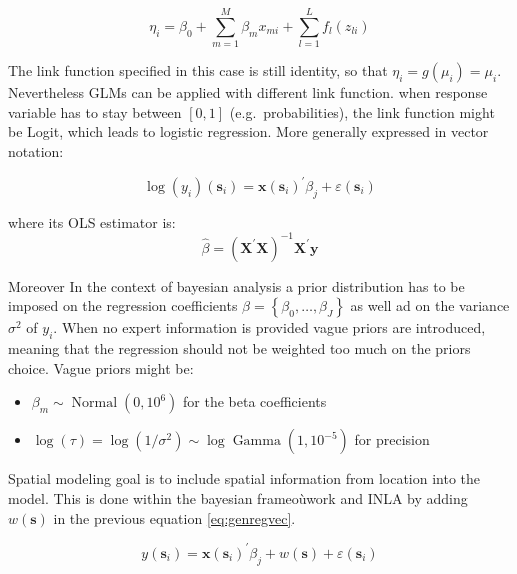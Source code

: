 \documentclass[
  12pt,
  a4paper,
  oneside]{book}
\providecommand{\tightlist}{%
  \setlength{\itemsep}{0pt}\setlength{\parskip}{0pt}}
\theoremstyle{definition}
\theoremstyle{definition}
\theoremstyle{definition}
\theoremstyle{remark}
\begin{document}
\begin{equation}
  \eta_{i}=\beta_{0}+\sum_{m=1}^{M} \beta_{m} x_{m i}+\sum_{l=1}^{L} f_{l}\left(z_{l i}\right)
\label{eq:linearpred}
\end{equation}

The link function specified in this case is still identity, so that \(\eta_{i}=g\left(\mu_{i}\right)=\mu_{i}\). Nevertheless GLMs can be applied with different link function. when response variable has to stay between \([0,1]\) (e.g.~probabilities), the link function might be Logit, which leads to logistic regression. More generally expressed in vector notation:

\begin{equation}
  \log(y_{i})\left(\mathbf{s}_{i}\right)=\mathbf{x}\left(\mathbf{s}_{i}\right)^{\prime} \beta_{j}+\varepsilon\left(\mathbf{s}_{i}\right)
  \label{eq:genregvec}
\end{equation}

where its OLS estimator is:
\begin{equation}
  \hat{\beta}=\left(\mathbf{X}^{\prime} \mathbf{X}\right)^{-1} \mathbf{X}^{\prime} \mathbf{y}
\label{eq:ols}
\end{equation}

Moreover In the context of bayesian analysis a prior distribution has to be imposed on the regression coefficients \(\beta = \left\{\beta_{0}, \ldots, \beta_{J}\right\}\) as well ad on the variance \(\sigma^{2}\) of \(y_{i}\). When no expert information is provided vague priors are introduced, meaning that the regression should not be weighted too much on the priors choice.
Vague priors might be:

\begin{itemize}
\tightlist
\item
  \(\beta_{m} \sim \operatorname{Normal}\left(0,10^{6}\right)\) for the beta coefficients
\item
  \(\log (\tau)=\log \left(1 / \sigma^{2}\right) \sim \log \operatorname{Gamma}\left(1,10^{-5}\right)\) for precision
\end{itemize}

Spatial modeling goal is to include spatial information from location into the model. This is done within the bayesian frameoùwork and INLA by adding \(w(\mathbf{s})\) in the previous equation \eqref{eq:genregvec}.

\[y\left(\mathbf{s}_{i}\right)=\mathbf{x}\left(\mathbf{s}_{i}\right)^{\prime}\beta_{j}+w(\mathbf{s})+\varepsilon\left(\mathbf{s}_{i}\right)\]
\end{document}
